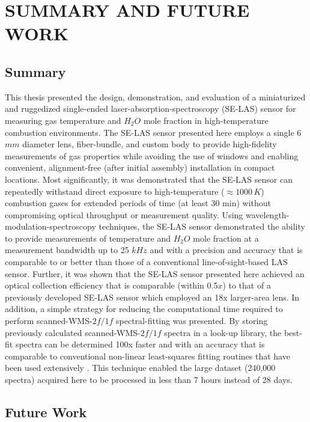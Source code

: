 \chapter{SUMMARY AND FUTURE WORK}
\section{Summary}
This thesis presented the design, demonstration, and evaluation of a miniaturized and ruggedized single-ended laser-absorption-spectroscopy (SE-LAS) sensor for measuring gas temperature and $H_2O$ mole fraction in high-temperature combustion environments. The SE-LAS sensor presented here employs a single 6 $mm$ diameter lens, fiber-bundle, and custom body to provide high-fidelity measurements of gas properties while avoiding the use of windows and enabling convenient, alignment-free (after initial assembly) installation in compact locations. Most significantly, it was demonstrated that the SE-LAS sensor can repeatedly withstand direct exposure to high-temperature ($\approx 1000 \,K$) combustion gases for extended periods of time (at least 30 min) without compromising optical throughput or measurement quality. Using wavelength-modulation-spectroscopy techniques, the SE-LAS sensor demonstrated the ability to provide measurements of temperature and $H_2O$ mole fraction at a measurement bandwidth up to 25 $kHz$ and with a precision and accuracy that is comparable to or better than those of a conventional line-of-sight-based LAS sensor. Further, it was shown that the SE-LAS sensor presented here achieved an optical collection efficiency that is comparable (within 0.5$x$) to that of a previously developed SE-LAS sensor which employed an 18x larger-area lens.
In addition, a simple strategy for reducing the computational time required to perform scanned-WMS-$2f/1f$ spectral-fitting was presented. By storing previously calculated scanned-WMS-$2f/1f$ spectra in a look-up library, the best-fit spectra can be determined 100x faster and with an accuracy that is comparable to conventional non-linear least-squares fitting routines that have been used extensively \cite{Goldenstein:16}. This technique enabled the large dataset (240,000 spectra) acquired here to be processed in less than 7 hours instead of 28 days.

\section{Future Work}
